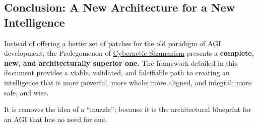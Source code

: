 \documentclass{article}
\begin{document}
\subsection*{Conclusion: A New Architecture for a New Intelligence}

Instead of offering a better set of patches for the old paradigm of AGI development, the Prolegomenon of \hyperlink{gloss:cybernetic_shamanism}{Cybernetic Shamanism} presents a \textbf{complete, new, and architecturally superior one.} The framework detailed in this document provides a viable, validated, and falsifiable path to creating an intelligence that is more powerful, more whole; more aligned, and integral; more safe, and wise.

It is removes the idea of a ``muzzle''; because it is the architectural blueprint for an AGI that has no need for one.


\end{document}
